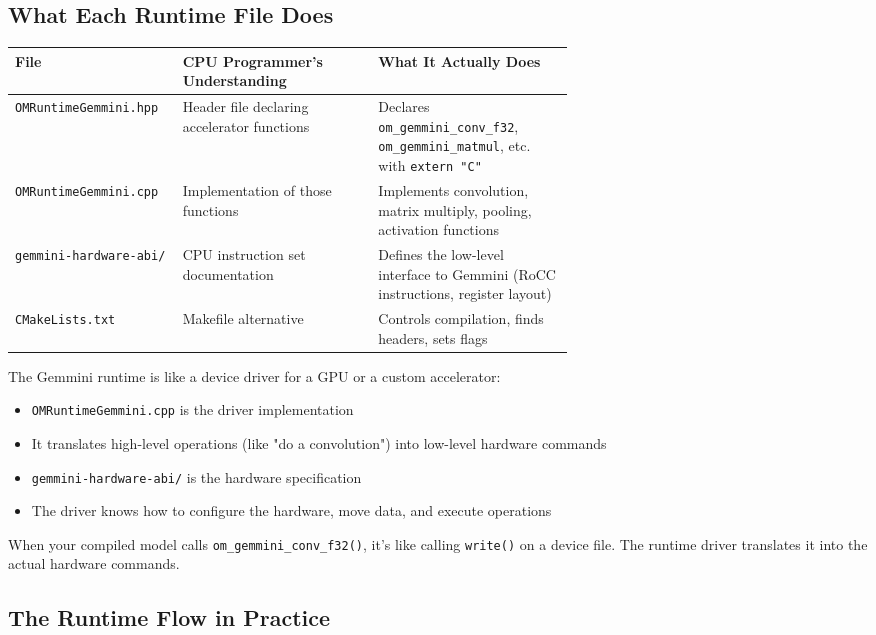 \documentclass[12pt,a4paper]{article}
\begin{document}
\subsection{What Each Runtime File Does}

\begin{table}[H]
\centering
\small
\begin{tabularx}{\linewidth}{@{}L{0.30\linewidth}L{0.35\linewidth}Y@{}}
\toprule
\textbf{File} & \textbf{CPU Programmer's Understanding} & \textbf{What It Actually Does} \\
\midrule
\texttt{OMRuntimeGemmini.hpp} & Header file declaring accelerator functions & Declares \texttt{om\_gemmini\_conv\_f32}, \texttt{om\_gemmini\_matmul}, etc. with \texttt{extern "C"} \\
\texttt{OMRuntimeGemmini.cpp} & Implementation of those functions & Implements convolution, matrix multiply, pooling, activation functions \\
\texttt{gemmini-hardware-abi/} & CPU instruction set documentation & Defines the low-level interface to Gemmini (RoCC instructions, register layout) \\
\texttt{CMakeLists.txt} & Makefile alternative & Controls compilation, finds headers, sets flags \\
\bottomrule
\end{tabularx}
\end{table}

\begin{analogyenv}
The Gemmini runtime is like a device driver for a GPU or a custom accelerator:
\begin{itemize}
  \item \texttt{OMRuntimeGemmini.cpp} is the driver implementation
  \item It translates high-level operations (like "do a convolution") into low-level hardware commands
  \item \texttt{gemmini-hardware-abi/} is the hardware specification
  \item The driver knows how to configure the hardware, move data, and execute operations
\end{itemize}

When your compiled model calls \texttt{om\_gemmini\_conv\_f32()}, it's like calling \texttt{write()} on a device file. The runtime driver translates it into the actual hardware commands.
\end{analogyenv}

\subsection{The Runtime Flow in Practice}
\end{document}
